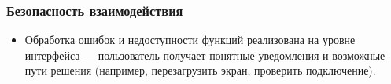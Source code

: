 \subsubsection*{Безопасность взаимодействия}
\begin{itemize}
    \item Обработка ошибок и недоступности функций реализована на уровне интерфейса — пользователь получает понятные уведомления и возможные пути решения (например, перезагрузить экран, проверить подключение).
\end{itemize}
